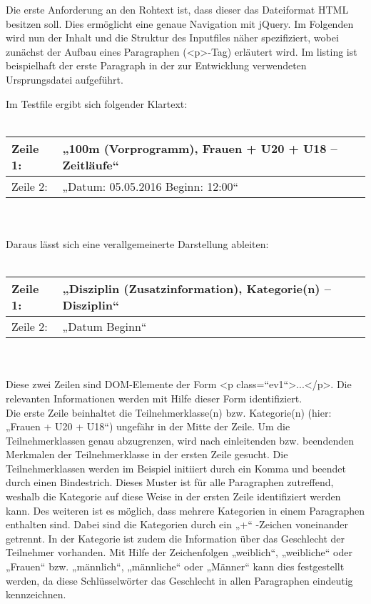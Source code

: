 {Die erste Anforderung an den Rohtext ist, dass dieser das Dateiformat HTML besitzen soll. Dies ermöglicht eine genaue Navigation mit jQuery. Im Folgenden wird nun der Inhalt und die Struktur des Inputfiles näher spezifiziert, wobei zunächst der Aufbau eines Paragraphen (<p>-Tag) erläutert wird. Im listing ist beispielhaft der erste Paragraph in der zur Entwicklung verwendeten Ursprungsdatei aufgeführt. 
\lstset{language=html}

Im Testfile ergibt sich folgender Klartext:\\
\\
\begin{tabular}{|l||l|}
\hline
Zeile 1: & „100m (Vorprogramm), Frauen + U20 + U18 – Zeitläufe“ \\
\hline
Zeile 2: & „Datum: 05.05.2016 Beginn: 12:00“ \\
\hline
\end{tabular} \\
\\
Daraus lässt sich eine verallgemeinerte Darstellung ableiten:\\
\\
\begin{tabular}{|l||l|}
\hline
Zeile 1: & „Disziplin (Zusatzinformation), Kategorie(n) – Disziplin“ \\
\hline
Zeile 2: & „Datum Beginn“ \\
\hline
\end{tabular} \\
\\
Diese zwei Zeilen sind DOM-Elemente der Form <p class=“ev1“>...</p>. Die relevanten Informationen werden mit Hilfe dieser Form identifiziert. \\
Die erste Zeile beinhaltet die Teilnehmerklasse(n) bzw. Kategorie(n) (hier: „Frauen + U20 + U18“) ungefähr in der Mitte der Zeile. Um die Teilnehmerklassen genau abzugrenzen, wird nach einleitenden bzw. beendenden Merkmalen der Teilnehmerklasse in der ersten Zeile gesucht. Die Teilnehmerklassen werden im Beispiel initiiert durch ein Komma und beendet durch einen Bindestrich. Dieses Muster ist für alle Paragraphen zutreffend, weshalb die Kategorie auf diese Weise in der ersten Zeile identifiziert werden kann. Des weiteren ist es möglich, dass mehrere Kategorien in einem Paragraphen enthalten sind. Dabei sind die Kategorien durch ein „+“ -Zeichen voneinander getrennt. 
In der Kategorie ist zudem die Information über das Geschlecht der Teilnehmer vorhanden. Mit Hilfe der Zeichenfolgen „weiblich“, „weibliche“ oder „Frauen“ bzw. „männlich“, „männliche“ oder „Männer“ kann dies festgestellt werden, da diese Schlüsselwörter das Geschlecht in allen Paragraphen eindeutig kennzeichnen. \\
}
